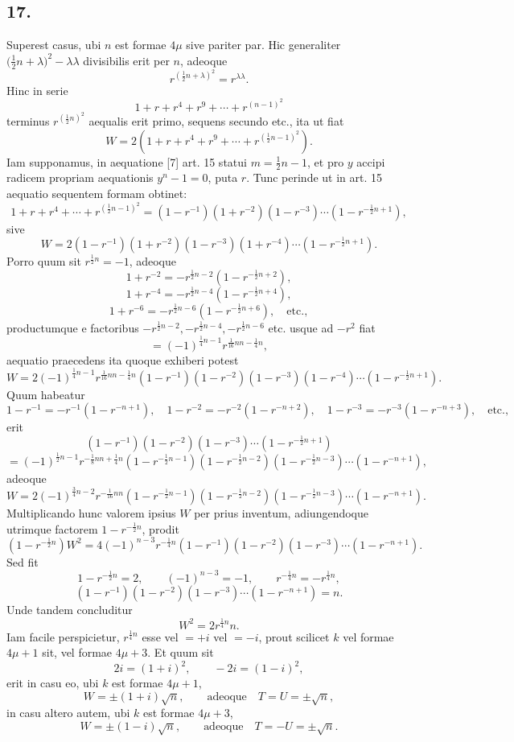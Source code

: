 \documentclass[12pt]{article}
\begin{document}
\subsection*{17.}

Superest casus, ubi $n$ est formae $4\mu$ sive pariter par. Hic generaliter $\bigl(\tfrac12 n+\lambda\bigr)^2-\lambda\lambda$ divisibilis erit per $n$, adeoque
\[
r^{(\frac12 n+\lambda)^2}=r^{\lambda\lambda}.
\]
Hinc in serie
\[
1+r+r^4+r^9+\cdots+r^{(n-1)^2}
\]
terminus $r^{(\frac12 n)^2}$ aequalis erit primo, sequens secundo etc., ita ut fiat
\[
W=2\left(1+r+r^4+r^9+\cdots+r^{(\frac12 n-1)^2}\right).
\]
Iam supponamus, in aequatione [7] art. 15 statui $m=\tfrac12 n-1$, et pro $y$ accipi radicem propriam aequationis $y^n-1=0$, puta $r$. Tunc perinde ut in art. 15 aequatio sequentem formam obtinet:
\[
1+r+r^4+\cdots+r^{(\frac12 n-1)^2}
=(1-r^{-1})(1+r^{-2})(1-r^{-3})\cdots(1-r^{-\frac12n+1}),
\]
sive
\[
W=2(1-r^{-1})(1+r^{-2})(1-r^{-3})(1+r^{-4})\cdots(1-r^{-\frac12 n+1}). \tag{8}
\]
Porro quum sit $r^{\frac12 n}=-1$, adeoque
\[
1+r^{-2}=-r^{\frac12 n-2}(1-r^{-\frac12 n+2}),
\]
\[
1+r^{-4}=-r^{\frac12 n-4}(1-r^{-\frac12 n+4}),
\]
\[
1+r^{-6}=-r^{\frac12 n-6}(1-r^{-\frac12 n+6}),\quad\text{etc.},
\]
productumque e factoribus $-r^{\frac12n-2},-r^{\frac12n-4},-r^{\frac12n-6}$ etc. usque ad $-r^2$ fiat
\[
=(-1)^{\frac14n-1}r^{\frac1{16}nn-\frac14n},
\]
aequatio praecedens ita quoque exhiberi potest
\[
W=2(-1)^{\frac14 n-1}r^{\frac1{16}nn-\frac14n}
(1-r^{-1})(1-r^{-2})(1-r^{-3})(1-r^{-4})\cdots(1-r^{-\frac12n+1}).
\]
Quum habeatur
\[
1-r^{-1}=-r^{-1}(1-r^{-n+1}),\quad
1-r^{-2}=-r^{-2}(1-r^{-n+2}),\quad
1-r^{-3}=-r^{-3}(1-r^{-n+3}),\quad\text{etc.},
\]
erit
\[
(1-r^{-1})(1-r^{-2})(1-r^{-3})\cdots(1-r^{-\frac12n+1})
\]
\[
=(-1)^{\frac12 n-1}r^{-\frac18 nn+\frac14 n}
(1-r^{-\frac12n-1})(1-r^{-\frac12n-2})(1-r^{-\frac12n-3})\cdots(1-r^{-n+1}),
\]
adeoque
\[
W=2(-1)^{\frac34 n-2}r^{-\frac1{16}nn}
(1-r^{-\frac12n-1})(1-r^{-\frac12n-2})(1-r^{-\frac12n-3})\cdots(1-r^{-n+1}).
\]
Multiplicando hunc valorem ipsius $W$ per prius inventum, adiungendoque utrimque factorem $1-r^{-\frac12n}$, prodit
\[
(1-r^{-\frac12 n})W^2
=4(-1)^{n-3}r^{-\frac14n}(1-r^{-1})(1-r^{-2})(1-r^{-3})\cdots(1-r^{-n+1}).
\]
Sed fit
\[
1-r^{-\frac12n}=2,\qquad (-1)^{n-3}=-1,\qquad r^{-\frac14n}=-r^{\frac14n},
\]
\[
(1-r^{-1})(1-r^{-2})(1-r^{-3})\cdots(1-r^{-n+1})=n.
\]
Unde tandem concluditur
\[
W^2=2r^{\frac14 n}n. \tag{9}
\]
Iam facile perspicietur, $r^{\frac14 n}$ esse vel $=+i$ vel $=-i$, prout scilicet $k$ vel formae $4\mu+1$ sit, vel formae $4\mu+3$. Et quum sit
\[
2i=(1+i)^2,\qquad -2i=(1-i)^2,
\]
erit in casu eo, ubi $k$ est formae $4\mu+1$,
\[
W=\pm(1+i)\sqrt n,\qquad\text{adeoque}\quad T=U=\pm\sqrt n,
\]
in casu altero autem, ubi $k$ est formae $4\mu+3$,
\[
W=\pm(1-i)\sqrt n,\qquad\text{adeoque}\quad T=-U=\pm\sqrt n.
\]
\end{document}
